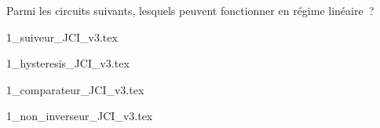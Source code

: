 




\hauteurLargeurCadreReponse		{8mm}{4cm}
\initialisationEntrainement

\debutEntrainement
 
Parmi les circuits suivants, lesquels peuvent fonctionner en régime linéaire~?

\medskip


\begin{enonce}
  \begin{listeQCM2Colonnes}
    \item \shorthandoff{!}
    {1_suiveur_JCI_v3.tex}
    \shorthandon{!}
    \item \shorthandoff{!}
    {1_hysteresis_JCI_v3.tex}
    \shorthandon{!}
    \item \shorthandoff{!}
    {1_comparateur_JCI_v3.tex}
    \shorthandon{!}
    \item \shorthandoff{!}
    {1_non_inverseur_JCI_v3.tex}
    \shorthandon{!}
  \end{listeQCM2Colonnes}
  \bigskip
\end{enonce}

